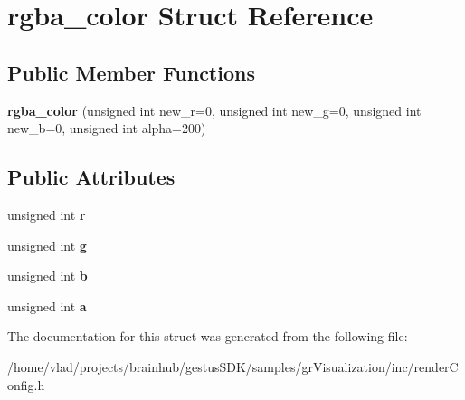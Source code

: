 \hypertarget{structrgba__color}{}\section{rgba\+\_\+color Struct Reference}
\label{structrgba__color}
\subsection*{Public Member Functions}
\begin{DoxyCompactItemize}
\item 
\mbox{\label{structrgba__color_a153c9bd3293dd09acca31bbaf1f58a2e}} 
{\bfseries rgba\+\_\+color} (unsigned int new\+\_\+r=0, unsigned int new\+\_\+g=0, unsigned int new\+\_\+b=0, unsigned int alpha=200)
\end{DoxyCompactItemize}
\subsection*{Public Attributes}
\begin{DoxyCompactItemize}
\item 
\mbox{\label{structrgba__color_af78b5652337df42c04d45cb828c5ebc1}} 
unsigned int {\bfseries r}
\item 
\mbox{\label{structrgba__color_ad77e1ea3e356545796c222f5ab19c1bb}} 
unsigned int {\bfseries g}
\item 
\mbox{\label{structrgba__color_af2d13f708cb1c8954a246f978a81ccda}} 
unsigned int {\bfseries b}
\item 
\mbox{\label{structrgba__color_ab74f4435556ee648eae8a3870bf362cc}} 
unsigned int {\bfseries a}
\end{DoxyCompactItemize}


The documentation for this struct was generated from the following file\+:\begin{DoxyCompactItemize}
\item 
/home/vlad/projects/brainhub/gestus\+S\+D\+K/samples/gr\+Visualization/inc/render\+Config.\+h\end{DoxyCompactItemize}

